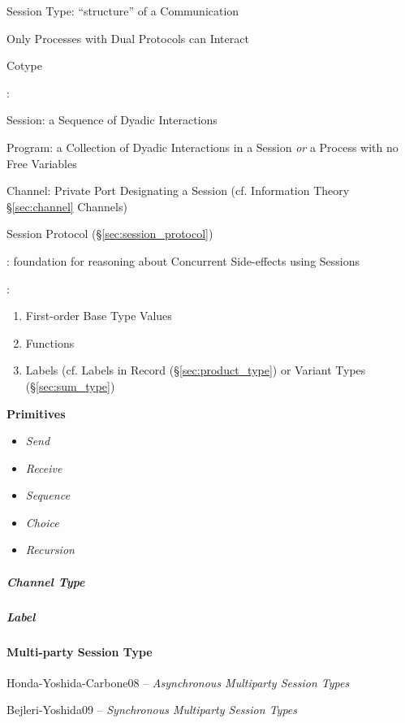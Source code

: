 Session Type: ``structure'' of a Communication

Only Processes with Dual Protocols can Interact

Cotype


\cite{honda-vasconcelos-kubo98}:

Session: a Sequence of Dyadic Interactions

Program: a Collection of Dyadic Interactions in a Session \emph{or} a
Process with no Free Variables %

Channel: Private Port Designating a Session (cf. Information Theory
\S\ref{sec:channel} Channels)

Session Protocol (\S\ref{sec:session_protocol})


\cite{orchard-yoshida15}: foundation for reasoning about Concurrent
Side-effects using Sessions


\cite{neubauer-thiemann04}:
\begin{enumerate}
  \item First-order Base Type Values
  \item Functions
  \item Labels (cf. Labels in Record (\S\ref{sec:product_type}) or
    Variant Types (\S\ref{sec:sum_type})
\end{enumerate}


\textbf{Primitives}

\begin{itemize}
  \item \emph{Send}
  \item \emph{Receive}
  \item \emph{Sequence}
  \item \emph{Choice}
  \item \emph{Recursion}
\end{itemize}



\subparagraph{Channel Type}\label{sec:channel_type}\hfill

\subparagraph{Label}\label{sec:channel_label}\hfill



\paragraph{Multi-party Session Type}\label{sec:multiparty_session}\hfill

Honda-Yoshida-Carbone08 -- \emph{Asynchronous Multiparty Session
  Types} \cite{honda-yoshida-carbone08}

Bejleri-Yoshida09 -- \emph{Synchronous Multiparty Session Types}

